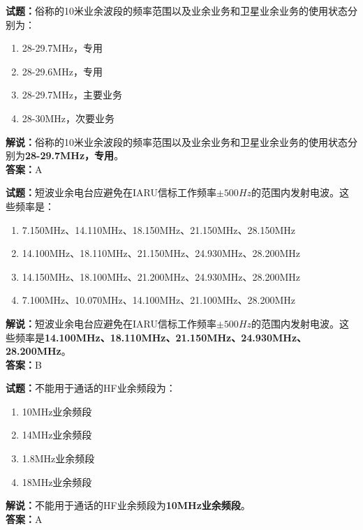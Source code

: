 \documentclass{ctexbook}
\begin{document}
\bigskip


\noindent\textbf{试题：}俗称的10米业余波段的频率范围以及业余业务和卫星业余业务的使用状态分别为：
\begin{enumerate}[leftmargin=3em]
\item 28-29.7\unit{\MHz}，专用
\item 28-29.6\unit{\MHz}，专用
\item 28-29.7\unit{\MHz}，主要业务
\item 28-30\unit{\MHz}，次要业务
\end{enumerate}
\noindent\textbf{解说：}俗称的10米业余波段的频率范围以及业余业务和卫星业余业务的使用状态分别为\textbf{28-29.7\unit{\MHz}，专用}。\\\noindent\textbf{答案：}A



\bigskip


\noindent\textbf{试题：}短波业余电台应避免在IARU信标工作频率\( \pm 500Hz\)的范围内发射电波。这些频率是：%
\begin{enumerate}[leftmargin=3em]
\item 7.150\unit{\MHz}、14.110\unit{\MHz}、18.150\unit{\MHz}、21.150\unit{\MHz}、28.150\unit{\MHz}
\item 14.100\unit{\MHz}、18.110\unit{\MHz}、21.150\unit{\MHz}、24.930\unit{\MHz}、28.200\unit{\MHz}
\item 14.150\unit{\MHz}、18.100\unit{\MHz}、21.200\unit{\MHz}、24.930\unit{\MHz}、28.200\unit{\MHz}
\item 7.100\unit{\MHz}、10.070\unit{\MHz}、14.100\unit{\MHz}、21.100\unit{\MHz}、28.200\unit{\MHz}
\end{enumerate}
\noindent\textbf{解说：}短波业余电台应避免在IARU信标工作频率\( \pm 500Hz\)的范围内发射电波。这些频率是\textbf{14.100\unit{\MHz}、18.110\unit{\MHz}、21.150\unit{\MHz}、24.930\unit{\MHz}、28.200\unit{\MHz}}。\\\noindent\textbf{答案：}B%



\bigskip


\noindent\textbf{试题：}不能用于通话的HF业余频段为：
\begin{enumerate}[leftmargin=3em]
\item 10\unit{\MHz}业余频段
\item 14\unit{\MHz}业余频段
\item 1.8\unit{\MHz}业余频段
\item 18\unit{\MHz}业余频段
\end{enumerate}
\noindent\textbf{解说：}不能用于通话的HF业余频段为\textbf{10\unit{\MHz}业余频段}。\\\noindent\textbf{答案：}A
\end{document}
